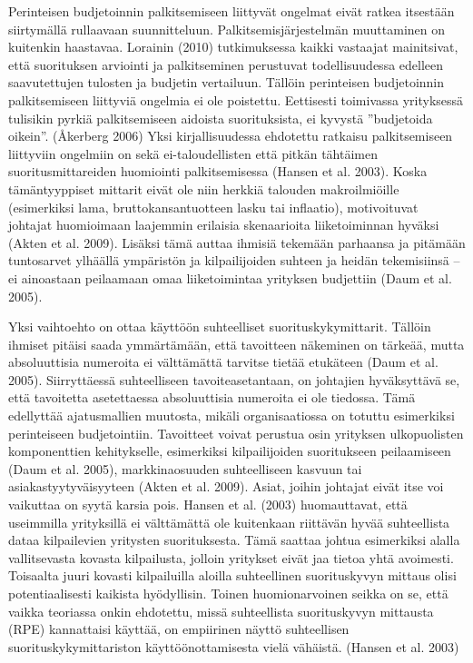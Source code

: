 \documentclass[12pt,a4paper,oneside,pdftex]{report}
\begin{document}
Perinteisen budjetoinnin palkitsemiseen liittyvät ongelmat eivät ratkea itsestään siirtymällä rullaavaan suunnitteluun. Palkitsemisjärjestelmän muuttaminen on kuitenkin haastavaa. Lorainin (2010) tutkimuksessa kaikki vastaajat mainitsivat, että suorituksen arviointi ja palkitseminen perustuvat todellisuudessa edelleen saavutettujen tulosten ja budjetin vertailuun. Tällöin perinteisen budjetoinnin palkitsemiseen liittyviä ongelmia ei ole poistettu. Eettisesti toimivassa yrityksessä tulisikin pyrkiä palkitsemiseen aidoista suorituksista, ei kyvystä ”budjetoida oikein”. (Åkerberg 2006) Yksi kirjallisuudessa ehdotettu ratkaisu palkitsemiseen liittyviin ongelmiin on sekä ei-taloudellisten että pitkän tähtäimen suoritusmittareiden huomiointi palkitsemisessa (Hansen et al. 2003). Koska tämäntyyppiset mittarit eivät ole niin herkkiä talouden makroilmiöille (esimerkiksi lama, bruttokansantuotteen lasku tai inflaatio), motivoituvat johtajat huomioimaan laajemmin erilaisia skenaarioita liiketoiminnan hyväksi (Akten et al. 2009).  Lisäksi tämä auttaa ihmisiä tekemään parhaansa ja pitämään tuntosarvet ylhäällä ympäristön ja kilpailijoiden suhteen ja heidän tekemisiinsä – ei ainoastaan peilaamaan omaa liiketoimintaa yrityksen budjettiin (Daum et al. 2005).

Yksi vaihtoehto on ottaa käyttöön suhteelliset suorituskykymittarit. Tällöin ihmiset pitäisi saada ymmärtämään, että tavoitteen näkeminen on tärkeää, mutta absoluuttisia numeroita ei välttämättä tarvitse tietää etukäteen (Daum et al. 2005). Siirryttäessä suhteelliseen tavoiteasetantaan, on johtajien hyväksyttävä se, että tavoitetta asetettaessa absoluuttisia numeroita ei ole tiedossa. Tämä edellyttää ajatusmallien muutosta, mikäli organisaatiossa on totuttu esimerkiksi perinteiseen budjetointiin. Tavoitteet voivat perustua osin yrityksen ulkopuolisten komponenttien kehitykselle, esimerkiksi kilpailijoiden suoritukseen peilaamiseen (Daum et al. 2005), markkinaosuuden suhteelliseen kasvuun tai asiakastyytyväisyyteen (Akten et al. 2009). Asiat, joihin johtajat eivät itse voi vaikuttaa on syytä karsia pois. Hansen et al. (2003) huomauttavat, että useimmilla yrityksillä ei välttämättä ole kuitenkaan riittävän hyvää suhteellista dataa kilpailevien yritysten suorituksesta. Tämä saattaa johtua esimerkiksi alalla vallitsevasta kovasta kilpailusta, jolloin yritykset eivät jaa tietoa yhtä avoimesti. Toisaalta juuri kovasti kilpailuilla aloilla suhteellinen suorituskyvyn mittaus olisi potentiaalisesti kaikista hyödyllisin. Toinen huomionarvoinen seikka on se, että vaikka teoriassa onkin ehdotettu, missä suhteellista suorituskyvyn mittausta (RPE) kannattaisi käyttää, on empiirinen näyttö suhteellisen suorituskykymittariston käyttöönottamisesta vielä vähäistä. (Hansen et al. 2003)
\end{document}
